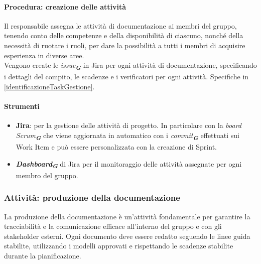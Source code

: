 \documentclass[a4paper,12pt]{article}
\newcommand{\glossario}[1]{\textit{#1}\textsubscript{\textbf{\textit{\textcolor{lightblack}{G}}}}}
\begin{document}
\paragraph{Procedura: creazione delle attività}
Il responsabile assegna le attività di documentazione ai membri del gruppo,
tenendo conto delle competenze e della disponibilità di ciascuno, nonché della
necessità di ruotare i ruoli, per dare la possibilità a tutti i membri di
acquisire esperienza in diverse aree.\\ Vengono create le \glossario{issue} in
Jira per ogni attività di documentazione, specificando i dettagli del compito,
le scadenze e i verificatori per ogni attività. Specifiche in
\ref{identificazioneTaskGestione}.

\paragraph{Strumenti}
\begin{itemize}
    \item \textbf{Jira}: per la gestione delle attività di progetto. In particolare con la
          \glossario{board Scrum} che viene aggiornata in automatico con i
          \glossario{commit} effettuati sui Work Item e può essere personalizzata con la
          creazione di Sprint.
    \item \glossario{\textbf{Dashboard}} di Jira per il monitoraggio delle attività assegnate per ogni membro del gruppo.
\end{itemize}

\subsubsection{Attività: produzione della documentazione}\label{produzioneDocs}
La produzione della documentazione è un'attività fondamentale per garantire la
tracciabilità e la comunicazione efficace all'interno del gruppo e con gli
stakeholder esterni. Ogni documento deve essere redatto seguendo le linee guida
stabilite, utilizzando i modelli approvati e rispettando le scadenze stabilite
durante la pianificazione.
\end{document}
